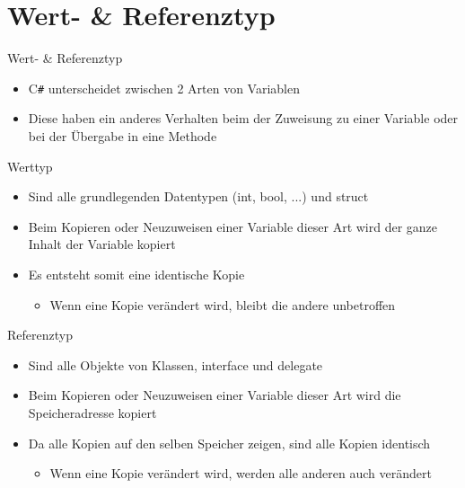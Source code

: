 \section{Wert- \& Referenztyp}
\begin{frame}{Wert- \& Referenztyp}
	\begin{itemize}
		\item C\texttt{\#} unterscheidet zwischen 2 Arten von Variablen
		\item Diese haben ein anderes Verhalten beim der Zuweisung zu einer Variable oder bei der Übergabe in eine Methode
	\end{itemize}
\end{frame}

\begin{frame}{Werttyp}
	\begin{itemize}
		\item Sind alle grundlegenden Datentypen (\alert{int}, \alert{bool}, ...) und \alert{struct}
	\end{itemize}
	\begin{itemize}
		\item Beim Kopieren oder Neuzuweisen einer Variable dieser Art wird der ganze Inhalt der Variable kopiert
		\item Es entsteht somit eine identische Kopie
		\begin{itemize}
			\item Wenn eine Kopie verändert wird, bleibt die andere unbetroffen
		\end{itemize}
	\end{itemize}
		
\end{frame}

\begin{frame}{Referenztyp}
	\begin{itemize}
		\item Sind alle Objekte von Klassen, \alert{interface} und \alert{delegate}
	\end{itemize}
	\begin{itemize}
		\item Beim Kopieren oder Neuzuweisen einer Variable dieser Art wird die Speicheradresse kopiert
		\item Da alle Kopien auf den selben Speicher zeigen, sind alle Kopien identisch
		\begin{itemize}
			\item Wenn eine Kopie verändert wird, werden alle anderen auch verändert
		\end{itemize}
	\end{itemize}
		
\end{frame}

